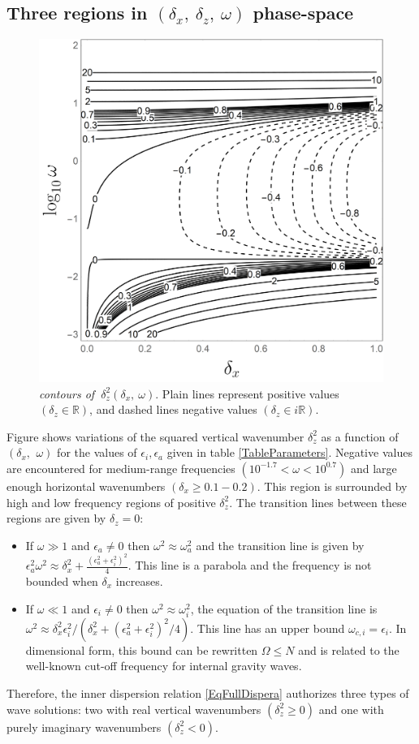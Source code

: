 \documentclass[a4paper,11pt]{article}
\begin{document}
\subsection{Three regions in $(\delta_x,\ \delta_z,\ \omega)$ phase-space}
\label{SubSectionDeltaz}
%
\begin{figure}[!h]
	\centering	
	\includegraphics[width=0.5\linewidth]{FIGURES/Contour_dz.png}
	\caption{\textit{contours of $\ \delta_z^2(\delta_x,\ \omega)$}. Plain lines represent positive values $(\delta_z\in\mathbb{R})$, and dashed lines negative values $(\delta_z\in i\mathbb{R})$.}
	\label{FigContourdz}
\end{figure}
%
Figure  shows variations of the squared vertical wavenumber $\delta_z^2$ as a function of $(\delta_x,\ \,\omega)$ for the values of $\epsilon_i, \epsilon_a$ given in table \ref{TableParameters}.  Negative values are encountered for medium-range frequencies $(10^{-1.7}<\omega<10^{0.7})$ and large enough horizontal wavenumbers $(\delta_x \geq 0.1-0.2)$. This region is surrounded by high and low frequency regions of positive $\delta_z^2$. The transition lines between these regions are given by $\delta_z=0$:
%
\begin{itemize}
	\item If $\omega \gg 1$ and $\epsilon_a \ne 0$ then $\omega^2\approx\omega_a^2$ and the transition line is given by 
	$\epsilon_a^2\omega^2 \approx
	\delta_x^2
 	+\frac{(\epsilon_a^2+\epsilon_i^2)^2}{4}$. This line is a parabola and the frequency is not bounded when $\delta_x$ increases. 
	\item If $\omega \ll 1$ and $\epsilon_i \ne 0$ then $\omega^2\approx\omega_i^2$, the equation of the transition line is $\omega^2\approx\delta_x^2\epsilon_i^2/(\delta_x^2+(\epsilon_a^2+\epsilon_i^2)^2/4)$. This line has an upper bound $\omega_{c,i}=\epsilon_i$.
	In dimensional form, this bound can be rewritten $\Omega\leq N$ and is related to the well-known cut-off frequency for internal gravity waves.%
\end{itemize}
%
Therefore, the inner dispersion relation \ref{EqFullDispera} authorizes three types of wave solutions: two with real vertical wavenumbers $(\delta_z^2\geq0)$ and one with purely imaginary wavenumbers $(\delta_z^2<0)$.
\end{document}
